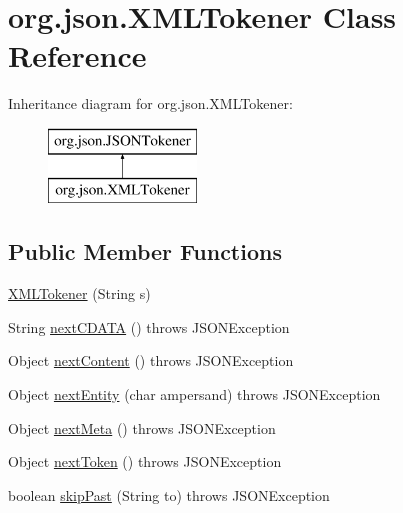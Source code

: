 \hypertarget{classorg_1_1json_1_1_x_m_l_tokener}{\section{org.\-json.\-X\-M\-L\-Tokener Class Reference}
\label{classorg_1_1json_1_1_x_m_l_tokener}
}
Inheritance diagram for org.\-json.\-X\-M\-L\-Tokener\-:\begin{figure}[H]
\begin{center}
\leavevmode
\includegraphics[height=2.000000cm]{classorg_1_1json_1_1_x_m_l_tokener}
\end{center}
\end{figure}
\subsection*{Public Member Functions}
\begin{DoxyCompactItemize}
\item 
\hyperlink{classorg_1_1json_1_1_x_m_l_tokener_a43ba71b6376938f07b4781fb6c66a7ac}{X\-M\-L\-Tokener} (String s)
\item 
String \hyperlink{classorg_1_1json_1_1_x_m_l_tokener_a0f321a2fa10eb19c08d05cf17cfa4e54}{next\-C\-D\-A\-T\-A} ()  throws J\-S\-O\-N\-Exception 
\item 
Object \hyperlink{classorg_1_1json_1_1_x_m_l_tokener_a356e0c4bb50197720b5eb638783b632c}{next\-Content} ()  throws J\-S\-O\-N\-Exception 
\item 
Object \hyperlink{classorg_1_1json_1_1_x_m_l_tokener_aa67ac8eb561a438290fad648fd295fd5}{next\-Entity} (char ampersand)  throws J\-S\-O\-N\-Exception 
\item 
Object \hyperlink{classorg_1_1json_1_1_x_m_l_tokener_aa36d5f6baf25f85fef0468fadcc3b8ff}{next\-Meta} ()  throws J\-S\-O\-N\-Exception 
\item 
Object \hyperlink{classorg_1_1json_1_1_x_m_l_tokener_a654e38e5abe2ad37e10f968613dab875}{next\-Token} ()  throws J\-S\-O\-N\-Exception 
\item 
boolean \hyperlink{classorg_1_1json_1_1_x_m_l_tokener_ac6dd60ff4fa12f0603ac8059f6036810}{skip\-Past} (String to)  throws J\-S\-O\-N\-Exception 
\end{DoxyCompactItemize}
